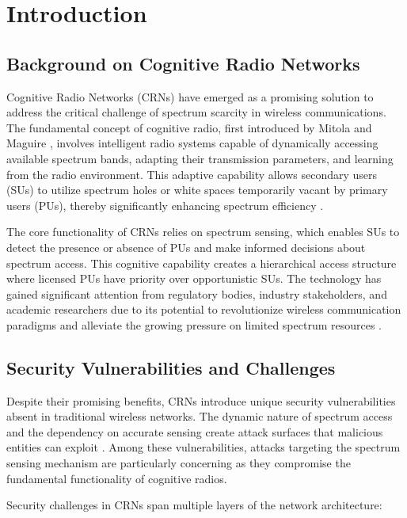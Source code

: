 \chapter{Introduction}

\section{Background on Cognitive Radio Networks}

Cognitive Radio Networks (CRNs) have emerged as a promising solution to address the critical challenge of spectrum scarcity in wireless communications. The fundamental concept of cognitive radio, first introduced by Mitola and Maguire \cite{mitola1999cognitive}, involves intelligent radio systems capable of dynamically accessing available spectrum bands, adapting their transmission parameters, and learning from the radio environment. This adaptive capability allows secondary users (SUs) to utilize spectrum holes or white spaces temporarily vacant by primary users (PUs), thereby significantly enhancing spectrum efficiency \cite{akyildiz2006next}.

The core functionality of CRNs relies on spectrum sensing, which enables SUs to detect the presence or absence of PUs and make informed decisions about spectrum access. This cognitive capability creates a hierarchical access structure where licensed PUs have priority over opportunistic SUs. The technology has gained significant attention from regulatory bodies, industry stakeholders, and academic researchers due to its potential to revolutionize wireless communication paradigms and alleviate the growing pressure on limited spectrum resources \cite{haykin2005cognitive}.

\section{Security Vulnerabilities and Challenges}

Despite their promising benefits, CRNs introduce unique security vulnerabilities absent in traditional wireless networks. The dynamic nature of spectrum access and the dependency on accurate sensing create attack surfaces that malicious entities can exploit \cite{clancy2007security, wang2010security}. Among these vulnerabilities, attacks targeting the spectrum sensing mechanism are particularly concerning as they compromise the fundamental functionality of cognitive radios.

Security challenges in CRNs span multiple layers of the network architecture:

